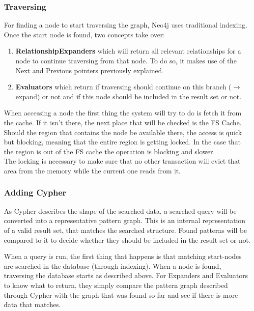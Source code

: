 \subsubsection{Traversing}
For finding a node to start traversing the graph, Neo4j uses traditional indexing. \citep[minute 32]{NeoInternals} Once the start node is found, two concepts take over:
\begin{enumerate}
\item \textbf{RelationshipExpanders} which will return all relevant relationships for a node to continue traversing from that node. To do so, it makes use of the Next and Previous pointers previously explained.
\item \textbf{Evaluators} which return if traversing should continue on this branch ($ \rightarrow $ expand) or not and if this node should be included in the result set or not.
\end{enumerate}
When accessing a node the first thing the system will try to do is fetch it from the cache. If it isn't there, the next place that will be checked is the FS Cache. Should the region that contains the node be available there, the access is quick but blocking, meaning that the entire region is getting locked. In the case that the region is out of the FS cache the operation is blocking and slower. \\
The locking is necessary to make sure that no other transaction will evict that area from the memory while the current one reads from it. \cite{NeoInternals}

\subsubsection{Adding Cypher}
As Cypher describes the shape of the searched data, a searched query will be converted into a representative pattern graph. This is an internal representation of a valid result set, that matches the searched structure. Found patterns will be compared to it to decide whether they should be included in the result set or not. \cite{NeoInternals}

When a query is run, the first thing that happens is that matching start-nodes are searched in the database (through indexing). When a node is found, traversing the database starts as described above. For Expanders and Evaluators to know what to return, they simply compare the pattern graph described through Cypher with the graph that was found so far and see if there is more data that matches. \cite{NeoInternals}

